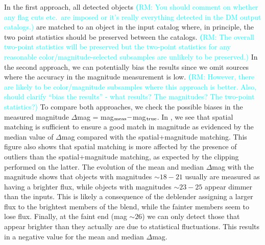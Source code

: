 \documentclass[twocolumn]{aastex62}
\newcommand{\rachel}[1]{{\textcolor{cyan}{{\textbf (RM: #1)}}}}
\begin{document}
In the first approach, all detected objects \rachel{You should comment on whether any flag cuts etc.\ are imposed or it's really everything detected in the DM output catalogs.} are matched to an object in the input catalog where, in principle, the two point statistics should be preserved between the catalogs. \rachel{The overall two-point statistics will be preserved but the two-point statistics for any reasonable color/magnitude-selected subsamples are unlikely to be preserved.} In the second approach, we can potentially bias the results since we omit sources where the accuracy in the magnitude measurement is low. \rachel{However, there are likely to be color/magnitude subsamples where this approach is better.  Also, should clarify ``bias the results'' - what results?  The magnitudes?  The two-point statistics?} To compare both approaches, we check the possible biases in the measured magnitude $\Delta$mag = mag$_{\rm meas} - $mag$_{\rm true}$. In , we see that spatial matching is sufficient to ensure a good match in magnitude as evidenced by the median value of $\Delta$mag compared with the spatial+magnitude matching. This figure also shows that spatial matching is more affected by the presence of outliers than the spatial+magnitude matching, as expected by the clipping performed on the latter. The evolution of the mean and median $\Delta$mag with the magnitude shows that objects with magnitudes $\sim 18-21$ usually are measured as having a brighter flux, while objects with magnitudes $\sim 23-25$ appear dimmer than the inputs. This is likely a consequence of the deblender assigning a larger flux to the brightest members of the blend, while the fainter members seem to lose flux. Finally, at the faint end (mag $\sim 26$) we can only detect those that appear brighter than they actually are due to statistical fluctuations. This results in a negative value for the mean and median $\Delta$mag.
\end{document}
